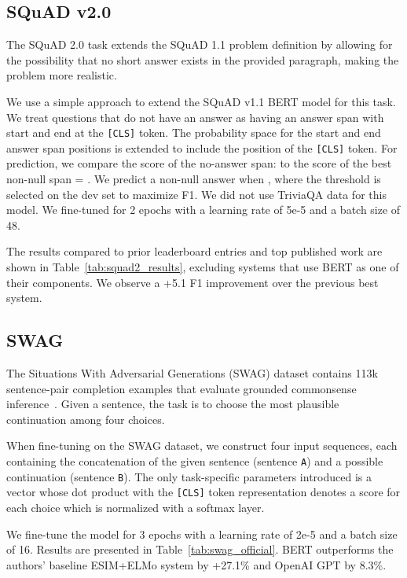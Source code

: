\documentclass[11pt,a4paper]{article}
\newcommand\bertlarge{BERT\xspace}
\begin{document}
\subsection{SQuAD v2.0}

The SQuAD 2.0 task extends the SQuAD 1.1 problem definition by allowing for the possibility that no short answer exists in the provided paragraph, making the problem more realistic.

We use a simple approach to extend the SQuAD v1.1 BERT model for this task. We treat questions that do not have an answer as having an answer span with start and end at the {\tt [CLS]} token. The probability space for the start and end answer span positions is extended to include the position of the {\tt [CLS]} token. For prediction, we compare the score of the no-answer span:  to the score of the best non-null span  =  . We predict a non-null answer when  , where the threshold  is selected on the dev set to maximize F1. We did not use TriviaQA data for this model. We fine-tuned for 2 epochs with a learning rate of 5e-5 and a batch size of 48.

The results compared to prior leaderboard entries and top published work \cite{unet,slqa} are shown in Table~\ref{tab:squad2_results}, excluding systems that use BERT as one of their components. We observe a +5.1 F1 improvement over the previous best system.


\subsection{SWAG}
\label{sec:swag}
The Situations With Adversarial Generations (SWAG) dataset contains 113k sentence-pair completion examples that evaluate grounded commonsense inference~\cite{zellers2018swag}. Given a sentence, the task is to choose the most plausible continuation among four choices.


When fine-tuning on the SWAG dataset, we construct four input sequences, each containing the concatenation of the given sentence (sentence {\tt A}) and a possible continuation (sentence {\tt B}). The only task-specific parameters introduced is a vector whose dot product with the {\tt [CLS]} token representation  denotes a score for each choice which is normalized with a softmax layer.

We fine-tune the model for 3 epochs with a learning rate of 2e-5 and a batch size of 16. Results are presented in Table~\ref{tab:swag_official}. \bertlarge outperforms the authors' baseline ESIM+ELMo system by +27.1\% and OpenAI GPT by 8.3\%.
\end{document}
